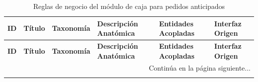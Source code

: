 \begin{landscape}
\begin{longtable}[c]{l p{2.1cm} p{2.1cm} p{8cm} p{4cm} p{3cm}}
\caption{Reglas de negocio del módulo de caja para pedidos anticipados} \label{tab:reglas-negocio-caja-pedidos-anticipados}\\
\toprule
\textbf{ID} & \textbf{Título} & \textbf{Taxonomía} & \textbf{Descripción Anatómica} & \textbf{Entidades Acopladas} & \textbf{Interfaz Origen} \\
\midrule
\endfirsthead

\toprule
\textbf{ID} & \textbf{Título} & \textbf{Taxonomía} & \textbf{Descripción Anatómica} & \textbf{Entidades Acopladas} & \textbf{Interfaz Origen} \\
\midrule
\endhead

\midrule
\multicolumn{6}{r}{\small Continúa en la página siguiente...} \\
\endfoot
\bottomrule
\endlastfoot


\end{longtable}
\end{landscape}
